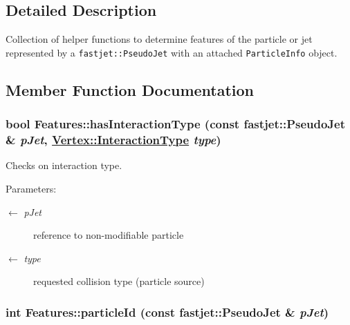\subsection{Detailed Description}
Collection of helper functions to determine features of the particle or jet represented by a {\tt fastjet::Pseudo\-Jet} with an attached {\tt Particle\-Info} object. 



\subsection{Member Function Documentation}
\hypertarget{structFeatures_10d51fec5501f0cd12bcfaf48ce2530b}{
\subsubsection[hasInteractionType]{\setlength{\rightskip}{0pt plus 5cm}bool Features::has\-Interaction\-Type (const fastjet::Pseudo\-Jet \& {\em p\-Jet}, \hyperlink{classVertex_0d80a5c5ed3bd9be72a325aa448eca25}{Vertex::Interaction\-Type} {\em type})}}
\label{structFeatures_10d51fec5501f0cd12bcfaf48ce2530b}


Checks on interaction type. 

\begin{Desc}
\item[Parameters:]
\begin{description}
\item[\mbox{$\leftarrow$} {\em p\-Jet}]reference to non-modifiable particle \item[\mbox{$\leftarrow$} {\em type}]requested collision type (particle source) \end{description}
\end{Desc}
\hypertarget{structFeatures_21401211e5f82aaf43d838be4996f819}{
\subsubsection[particleId]{\setlength{\rightskip}{0pt plus 5cm}int Features::particle\-Id (const fastjet::Pseudo\-Jet \& {\em p\-Jet})}}
\label{structFeatures_21401211e5f82aaf43d838be4996f819}


